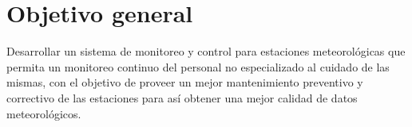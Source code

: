 \section{Objetivo general}

Desarrollar un sistema de monitoreo y control para estaciones meteorológicas que permita un monitoreo continuo del personal no especializado al cuidado de las mismas, con el objetivo de proveer un mejor mantenimiento preventivo y correctivo de las estaciones para así obtener una mejor calidad de datos meteorológicos.
